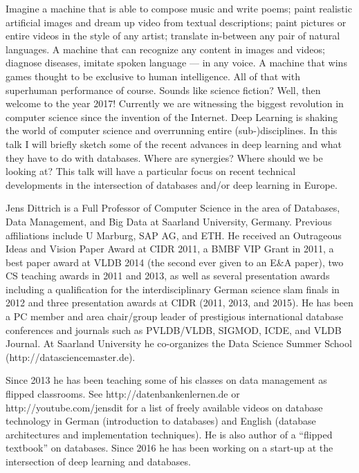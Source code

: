 
Imagine a machine that is able to compose music and write poems; paint realistic artificial images and dream up video from textual descriptions; paint pictures or entire videos in the style of any artist; translate in-between any pair of natural languages. A machine that can recognize any content in images and videos; diagnose diseases, imitate spoken language — in any voice. A machine that wins games thought to be exclusive to human intelligence. All of that with superhuman performance of course.  Sounds like science fiction? Well, then welcome to the year 2017! Currently we are witnessing the biggest revolution in computer science since the invention of the Internet. Deep Learning is shaking the world of computer science and overrunning entire (sub-)disciplines. In this talk I will briefly sketch some of the recent advances in deep learning and what they have to do with databases. Where are synergies? Where should we be looking at? This talk will have a particular focus on recent technical developments in the intersection of databases and/or deep learning in Europe.

Jens Dittrich is a Full Professor of Computer Science in the area of Databases, Data Management, and Big Data at Saarland University, Germany. Previous affiliations include U Marburg, SAP AG, and ETH. He received an Outrageous Ideas and Vision Paper Award at CIDR 2011, a BMBF VIP Grant in 2011, a best paper award at VLDB 2014 (the second ever given to an E\&A paper), two CS teaching awards in 2011 and 2013, as well as several presentation awards including a qualification for the interdisciplinary German science slam finals in 2012 and three presentation awards at CIDR (2011, 2013, and 2015). He has been a PC member and area chair/group leader of prestigious international database conferences and journals such as PVLDB/VLDB, SIGMOD, ICDE, and VLDB Journal. At Saarland University he co-organizes the Data Science Summer School (http://datasciencemaster.de).

 Since 2013 he has been teaching some of his classes on data management as flipped classrooms. See http://datenbankenlernen.de or http://youtube.com/jensdit for a list of freely available videos on database technology in German (introduction to databases) and English (database architectures and implementation techniques). He is also author of a ``flipped textbook'' on databases. Since 2016 he has been working on a start-up at the intersection of deep learning and databases.


